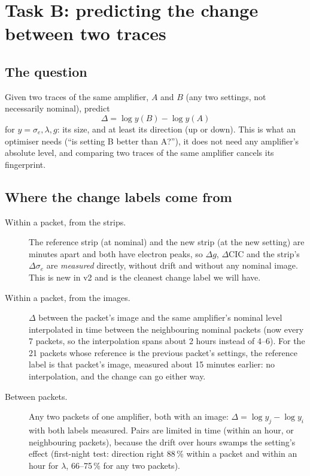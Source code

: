 \documentclass[11pt]{article}
\begin{document}
\section{Task B: predicting the change between two traces}

\subsection{The question}
Given two traces of the same amplifier, $A$ and $B$ (any two settings, not necessarily nominal), predict
\begin{equation}
\Delta=\log y(B)-\log y(A)
\end{equation}
for $y=\sigma_e,\lambda,g$: its size, and at least its direction (up or down). This is what an optimiser needs (``is
setting B better than A?''), it does not need any amplifier's absolute level, and comparing two traces of the same
amplifier cancels its fingerprint.

\subsection{Where the change labels come from}
\begin{description}
\item[Within a packet, from the strips.] The reference strip (at nominal) and the new strip (at the new setting) are
  minutes apart and both have electron peaks, so $\Delta g$, $\Delta$CIC and the strip's $\Delta\sigma_e$ are
  \emph{measured} directly, without drift and without any nominal image. This is new in v2 and is the cleanest change
  label we will have.
\item[Within a packet, from the images.] $\Delta$ between the packet's image and the same amplifier's nominal level
  interpolated in time between the neighbouring nominal packets (now every 7 packets, so the interpolation spans about
  2 hours instead of 4--6). For the 21 packets whose reference is the previous packet's settings, the reference label
  is that packet's image, measured about 15 minutes earlier: no interpolation, and the change can go either way.
\item[Between packets.] Any two packets of one amplifier, both with an image: $\Delta=\log y_j-\log y_i$ with both labels
  measured. Pairs are limited in time (within an hour, or neighbouring packets), because the drift over hours swamps the
  setting's effect (first-night test: direction right 88\,\% within a packet and within an hour for $\lambda$, 66--75\,\%
  for any two packets).
\end{description}
\end{document}
